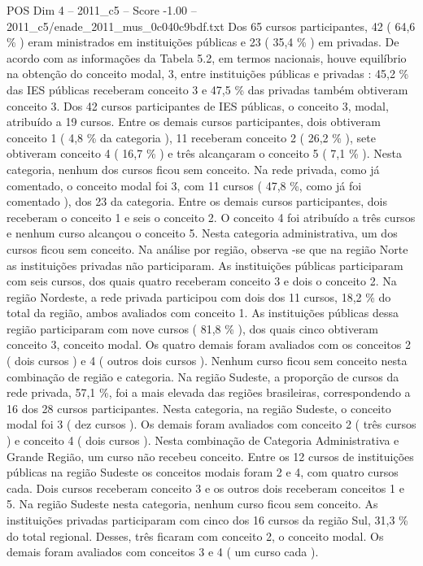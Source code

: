 \begin{textsample}{POS Dim 4 – 2011\_c5 – Score -1.00 – 2011\_c5/enade\_2011\_mus\_0c040c9bdf.txt}
Dos 65 cursos participantes, 42 ( 64,6 \% ) eram ministrados em instituições públicas e 23 ( 35,4 \% ) em privadas.
De acordo com as informações da Tabela 5.2, em termos nacionais, houve equilíbrio na obtenção do conceito modal, 3, entre instituições públicas e privadas : 45,2 \% das IES públicas receberam conceito 3 e 47,5 \% das privadas também obtiveram conceito 3.
Dos 42 cursos participantes de IES públicas, o conceito 3, modal, atribuído a 19 cursos.
Entre os demais cursos participantes, dois obtiveram conceito 1 ( 4,8 \% da categoria ), 11 receberam conceito 2 ( 26,2 \% ), sete obtiveram conceito 4 ( 16,7 \% ) e três alcançaram o conceito 5 ( 7,1 \% ).
Nesta categoria, nenhum dos cursos ficou sem conceito.
Na rede privada, como já comentado, o conceito modal foi 3, com 11 cursos ( 47,8 \%, como já foi comentado ), dos 23 da categoria.
Entre os demais cursos participantes, dois receberam o conceito 1 e seis o conceito 2.
O conceito 4 foi atribuído a três cursos e nenhum curso alcançou o conceito 5.
Nesta categoria administrativa, um dos cursos ficou sem conceito.
Na análise por região, observa -se que na região Norte as instituições privadas não participaram.
As instituições públicas participaram com seis cursos, dos quais quatro receberam conceito 3 e dois o conceito 2.
Na região Nordeste, a rede privada participou com dois dos 11 cursos, 18,2 \% do total da região, ambos avaliados com conceito 1.
As instituições públicas dessa região participaram com nove cursos ( 81,8 \% ), dos quais cinco obtiveram conceito 3, conceito modal.
Os quatro demais foram avaliados com os conceitos 2 ( dois cursos ) e 4 ( outros dois cursos ).
Nenhum curso ficou sem conceito nesta combinação de região e categoria.
Na região Sudeste, a proporção de cursos da rede privada, 57,1 \%, foi a mais elevada das regiões brasileiras, correspondendo a 16 dos 28 cursos participantes.
Nesta categoria, na região Sudeste, o conceito modal foi 3 ( dez cursos ).
Os demais foram avaliados com conceito 2 ( três cursos ) e conceito 4 ( dois cursos ).
Nesta combinação de Categoria Administrativa e Grande Região, um curso não recebeu conceito.
Entre os 12 cursos de instituições públicas na região Sudeste os conceitos modais foram 2 e 4, com quatro cursos cada.
Dois cursos receberam conceito 3 e os outros dois receberam conceitos 1 e 5.
Na região Sudeste nesta categoria, nenhum curso ficou sem conceito.
As instituições privadas participaram com cinco dos 16 cursos da região Sul, 31,3 \% do total regional.
Desses, três ficaram com conceito 2, o conceito modal.
Os demais foram avaliados com conceitos 3 e 4 ( um curso cada ).

\end{textsample}
